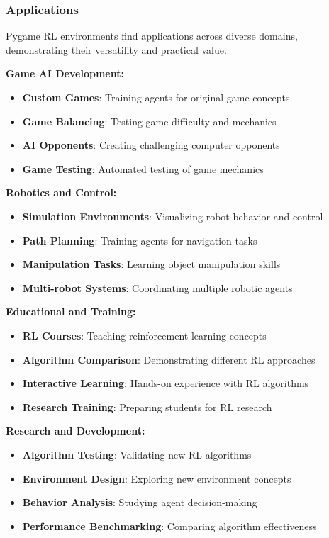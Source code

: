 \documentclass[12pt]{article}
\begin{document}
{{{\subsubsection{Applications}

Pygame RL environments find applications across diverse domains, demonstrating their versatility and practical value.

\textbf{Game AI Development:}
\begin{itemize}
    \item \textbf{Custom Games}: Training agents for original game concepts
    \item \textbf{Game Balancing}: Testing game difficulty and mechanics
    \item \textbf{AI Opponents}: Creating challenging computer opponents
    \item \textbf{Game Testing}: Automated testing of game mechanics
\end{itemize}

\textbf{Robotics and Control:}
\begin{itemize}
    \item \textbf{Simulation Environments}: Visualizing robot behavior and control
    \item \textbf{Path Planning}: Training agents for navigation tasks
    \item \textbf{Manipulation Tasks}: Learning object manipulation skills
    \item \textbf{Multi-robot Systems}: Coordinating multiple robotic agents
\end{itemize}

\textbf{Educational and Training:}
\begin{itemize}
    \item \textbf{RL Courses}: Teaching reinforcement learning concepts
    \item \textbf{Algorithm Comparison}: Demonstrating different RL approaches
    \item \textbf{Interactive Learning}: Hands-on experience with RL algorithms
    \item \textbf{Research Training}: Preparing students for RL research
\end{itemize}

\textbf{Research and Development:}
\begin{itemize}
    \item \textbf{Algorithm Testing}: Validating new RL algorithms
    \item \textbf{Environment Design}: Exploring new environment concepts
    \item \textbf{Behavior Analysis}: Studying agent decision-making
    \item \textbf{Performance Benchmarking}: Comparing algorithm effectiveness
\end{itemize}

}}}
\end{document}
